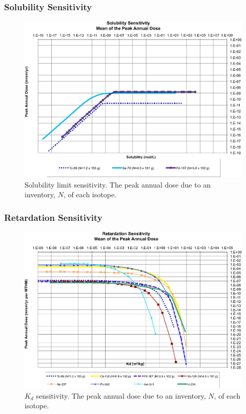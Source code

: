 \begin{frame}[ctb]
\frametitle{Solubility Sensitivity}
\begin{figure}[ht]
  \centering
  \includegraphics[width=\linewidth]{Solubility_Summary.eps}
  \caption{Solubility limit sensitivity. The peak annual dose due to an 
  inventory, 
  $N$, of each isotope.}
  \label{fig:SolSum}
\end{figure}
\end{frame}

\begin{frame}[ctb]
\frametitle{Retardation Sensitivity}
\begin{figure}[ht]
  \centering
  \includegraphics[width=\linewidth]{Partitioning_Summary.eps}
  \caption{$K_d$ sensitivity.  The peak annual dose due to an inventory, 
  $N$, of each isotope.}
  \label{fig:KdSum}
\end{figure}
\end{frame}


